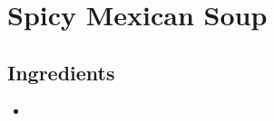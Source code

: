 \thispagestyle{fancy}
\section{Spicy Mexican Soup}
\AddToShipoutPicture*{\MexicanSoup}

\subsection*{Ingredients}
\begin{multicols}{3}
	\begin{itemize}
		\item 
	\end{itemize}
\end{multicols}